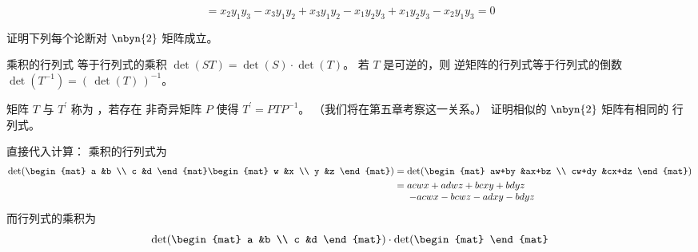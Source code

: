 \begin{exercises}
\begin{answer}
\begin{equation*}
        =x_2y_1y_3-x_3y_1y_2+x_3y_1y_2-x_1y_2y_3+x_1y_2y_3-x_2y_1y_3=0
      \end{equation*}  
    \end{answer}
  \item 
    证明下列每个论断对 $\nbyn{2}$ 矩阵成立。  
    \begin{exparts}
      \partsitem 乘积的行列式
        等于行列式的乘积
        $\det(ST)=\det(S)\cdot\det(T)$。
      \partsitem 若 \( T \) 是可逆的，则
        逆矩阵的行列式等于行列式的倒数
        \( \det(T^{-1})=(\,\det(T)\,)^{-1} \)。
    \end{exparts}
    矩阵 $T$ 与 $T^\prime$ 称为
    ，若存在
    非奇异矩阵 $P$ 使得 $T^\prime=PTP^{-1}$。
    （我们将在第五章考察这一关系。）
    证明相似的 \( \nbyn{2} \) 矩阵有相同的
    行列式。
    \begin{answer}
       \begin{exparts}
        \partsitem 直接代入计算：
          乘积的行列式为
          \begin{align*}
             \det(\begin{mat}
                       a  &b  \\
                       c  &d
                    \end{mat}
                    \begin{mat}
                       w  &x  \\
                       y  &z
                    \end{mat}  )
             &=
             \det(\begin{mat}
                 aw+by  &ax+bz  \\
                 cw+dy  &cx+dz
              \end{mat} )                 \\
             &=
             \begin{array}[t]{@{}l@{}} 
                 acwx+adwz+bcxy+bdyz  \\
                 \> -acwx-bcwz-adxy-bdyz
             \end{array}
          \end{align*}
          而行列式的乘积为
          \begin{equation*}
             \det(\begin{mat}
                a  &b  \\
                c  &d
             \end{mat})
             \cdot\det(\begin{mat}

\end{mat}
\end{equation*}
\end{exparts}
\end{answer}
\end{exercises}
